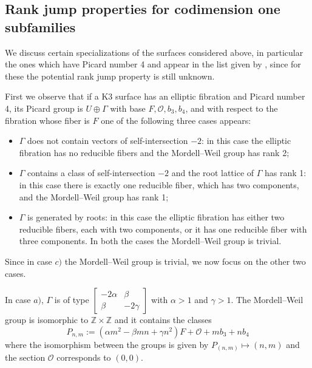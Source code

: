 \documentclass{amsart}
\theoremstyle{definition}
\numberwithin{equation}{section}
\newcommand{\Z}{\mathbb{Z}}
\renewcommand{\O}{\mathcal{O}}
\begin{document}
\subsection{Rank jump properties for codimension one subfamilies}\label{seubsect: codimension 1 subfamilies}
 We discuss certain specializations of the surfaces considered above, in particular the ones which have Picard number 4 and appear in the list given by \cite{GM}, since for these the potential rank jump property is still unknown.

First we observe that if a K3 surface has an elliptic fibration and Picard number 4, its Picard group is $U\oplus \Gamma$ with base $F,\O, b_3,b_4$, and with respect to the fibration whose fiber is $F$ one of the following three cases appears: \begin{itemize}\item[a)] $\Gamma$ does not contain vectors of self-intersection $-2$: in this case the elliptic fibration has no reducible fibers and the Mordell--Weil group has rank 2;
\item[b)] $\Gamma$ contains a class of self-intersection $-2$ and the root lattice of $\Gamma$ has rank 1: in this case there is exactly one reducible fiber, which has two components, and the Mordell--Weil group has rank 1; \item[c)] $\Gamma$ is generated by roots: in this case the elliptic fibration has either two reducible fibers, each with two components, or it has one reducible fiber with three components. In both the cases the Mordell--Weil group is trivial.\end{itemize}

Since in case $c)$ the Mordell--Weil group is trivial, we now focus on the other two cases.

In case $a)$, $\Gamma$ is of type $\left[\begin{array}{cc}-2\alpha&\beta\\ \beta&-2\gamma\end{array}\right]$ with $\alpha>1$ and $\gamma>1$. The Mordell--Weil group is isomorphic to $\Z\times \Z$ and it contains the classes \begin{equation}\label{eq: sections rkMw=2}P_{n,m}:=(\alpha m^2-\beta m n+\gamma n^2)F+\O+mb_3+nb_4\end{equation} where the isomorphism between the groups is given by $P_{(n,m)}\mapsto (n,m) $ and the section $\O$ corresponds to $(0,0)$.
\end{document}
